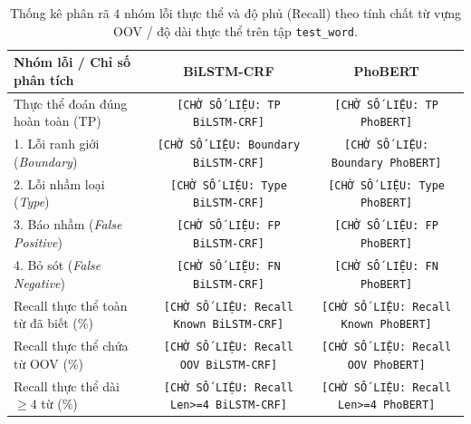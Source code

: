 \documentclass[11pt,a4paper,twocolumn]{article}
\begin{document}
\begin{table}[t]
\centering
\small
\begin{tabular}{lcc}
\hline
\textbf{Nhóm lỗi / Chỉ số phân tích} & \textbf{BiLSTM-CRF} & \textbf{PhoBERT} \\
\hline
Thực thể đoán đúng hoàn toàn (TP) & \texttt{[CHỜ SỐ LIỆU: TP BiLSTM-CRF]} & \texttt{[CHỜ SỐ LIỆU: TP PhoBERT]} \\
1. Lỗi ranh giới (\textit{Boundary}) & \texttt{[CHỜ SỐ LIỆU: Boundary BiLSTM-CRF]} & \texttt{[CHỜ SỐ LIỆU: Boundary PhoBERT]} \\
2. Lỗi nhầm loại (\textit{Type}) & \texttt{[CHỜ SỐ LIỆU: Type BiLSTM-CRF]} & \texttt{[CHỜ SỐ LIỆU: Type PhoBERT]} \\
3. Báo nhầm (\textit{False Positive}) & \texttt{[CHỜ SỐ LIỆU: FP BiLSTM-CRF]} & \texttt{[CHỜ SỐ LIỆU: FP PhoBERT]} \\
4. Bỏ sót (\textit{False Negative}) & \texttt{[CHỜ SỐ LIỆU: FN BiLSTM-CRF]} & \texttt{[CHỜ SỐ LIỆU: FN PhoBERT]} \\
\hline
Recall thực thể toàn từ đã biết (\%) & \texttt{[CHỜ SỐ LIỆU: Recall Known BiLSTM-CRF]} & \texttt{[CHỜ SỐ LIỆU: Recall Known PhoBERT]} \\
Recall thực thể chứa từ OOV (\%) & \texttt{[CHỜ SỐ LIỆU: Recall OOV BiLSTM-CRF]} & \texttt{[CHỜ SỐ LIỆU: Recall OOV PhoBERT]} \\
Recall thực thể dài $\ge 4$ từ (\%) & \texttt{[CHỜ SỐ LIỆU: Recall Len>=4 BiLSTM-CRF]} & \texttt{[CHỜ SỐ LIỆU: Recall Len>=4 PhoBERT]} \\
\hline
\end{tabular}
\caption{Thống kê phân rã $4$ nhóm lỗi thực thể và độ phủ (Recall) theo tính chất từ vựng OOV / độ dài thực thể trên tập \texttt{test\_word}.}
\label{tab:error_breakdown}
\end{table}
\end{document}
